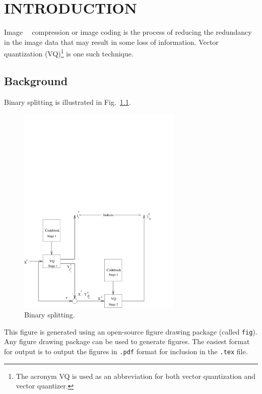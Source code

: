 %
%
%
%

\chapter{INTRODUCTION}\label{ch:introduction}
\thispagestyle{empty}

Image~\cite{TEST}~\cite{TEST2} compression or image coding is the process of reducing the
redundancy in the image data that may result in some loss of
information.  Vector quantization (VQ)\footnote{The acronym VQ is used
  as an abbreviation for both vector quantization and vector
  quantizer.} is one such technique.

\section{Background}\label{sec:background}
Binary splitting is illustrated in Fig.~\ref{fig:split}.

\begin{figure}[htbp]
\centering
\includegraphics[width=0.7\textwidth]{samplefig}
\caption{Binary splitting.}
\label{fig:split}
\end{figure}
This figure is generated using an open-source figure drawing package
(called {\tt fig}).  Any figure drawing package can be used to
generate figures.  The easiest format for output is to output the
figures in {\tt .pdf} format for inclusion in the {\tt .tex} file.

